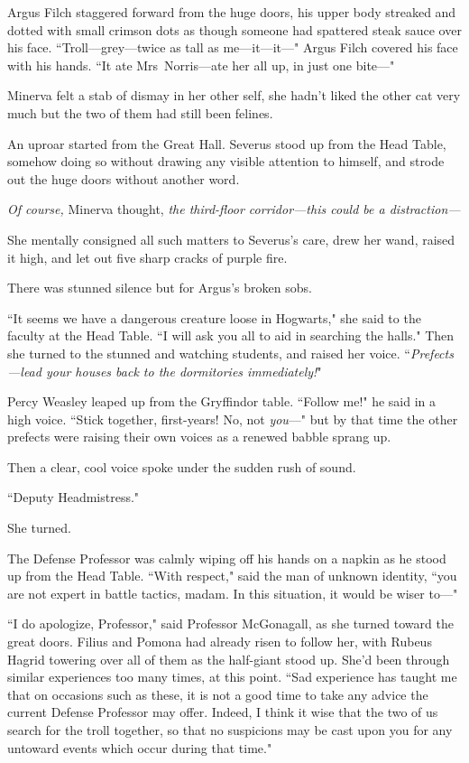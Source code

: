 Argus Filch staggered forward from the huge doors, his upper body streaked and dotted with small crimson dots as though someone had spattered steak sauce over his face. ``Troll—grey—twice as tall as me—it—it—" Argus Filch covered his face with his hands. ``It ate Mrs~Norris—ate her all up, in just one bite—"

Minerva felt a stab of dismay in her other self, she hadn't liked the other cat very much but the two of them had still been felines.

An uproar started from the Great Hall. Severus stood up from the Head Table, somehow doing so without drawing any visible attention to himself, and strode out the huge doors without another word.

\emph{Of course,} Minerva thought, \emph{the third-floor corridor—this could be a distraction—}

She mentally consigned all such matters to Severus's care, drew her wand, raised it high, and let out five sharp cracks of purple fire.

There was stunned silence but for Argus's broken sobs.

``It seems we have a dangerous creature loose in Hogwarts," she said to the faculty at the Head Table. ``I will ask you all to aid in searching the halls." Then she turned to the stunned and watching students, and raised her voice. ``\emph{Prefects—lead your houses back to the dormitories immediately!}"

Percy Weasley leaped up from the Gryffindor table. ``Follow me!" he said in a high voice. ``Stick together, first-years! No, not \emph{you}—" but by that time the other prefects were raising their own voices as a renewed babble sprang up.

Then a clear, cool voice spoke under the sudden rush of sound.

``Deputy Headmistress."

She turned.

The Defense Professor was calmly wiping off his hands on a napkin as he stood up from the Head Table. ``With respect," said the man of unknown identity, ``you are not expert in battle tactics, madam. In this situation, it would be wiser to—"

``I do apologize, Professor," said Professor McGonagall, as she turned toward the great doors. Filius and Pomona had already risen to follow her, with Rubeus Hagrid towering over all of them as the half-giant stood up. She'd been through similar experiences too many times, at this point. ``Sad experience has taught me that on occasions such as these, it is not a good time to take any advice the current Defense Professor may offer. Indeed, I think it wise that the two of us search for the troll together, so that no suspicions may be cast upon you for any untoward events which occur during that time."

